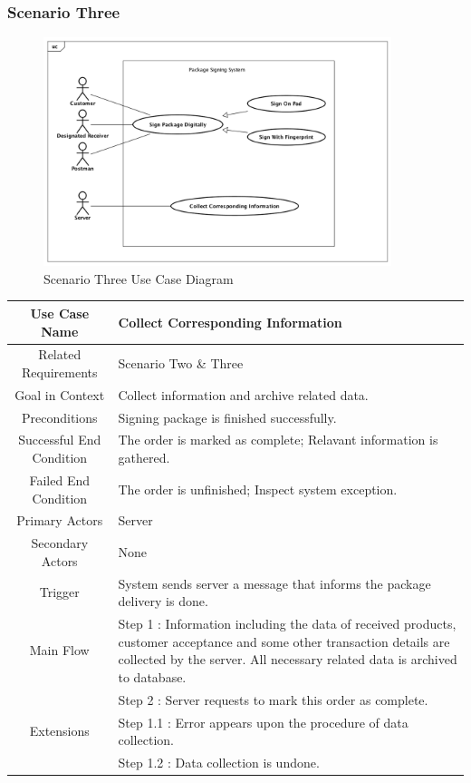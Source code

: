 \documentclass[12pt]{scrreprt}
\begin{document}
\subsubsection{Scenario Three}
\begin{figure}[H]
  \centering\includegraphics[width=4in]{DocumentRes/3UseCaseDiagram.png}
  \caption{Scenario Three Use Case Diagram}
\end{figure}

\begin{table}[H]
  \centering
  \begin{tabular}{| c | p{11cm} |}
    \hline
    Use Case Name & Collect Corresponding Information\\
    \hline
    Related Requirements & Scenario Two \& Three\\
    \hline
    Goal in Context & Collect information and archive related data.\\
    \hline
    Preconditions & Signing package is finished successfully.\\
    \hline
    Successful End Condition & The order is marked as complete; Relavant
    information is gathered.\\
    \hline
    Failed End Condition & The order is unfinished; Inspect system exception.\\
    \hline
    Primary Actors & Server\\
    \hline
    Secondary Actors & None\\
    \hline
    Trigger & System sends server a message that informs the package delivery
    is done.\\
    \hline
    Main Flow & Step 1 : Information including the data of received products,
    customer acceptance and some other transaction details are collected by
    the server. All necessary related data is archived to database.\\
    & Step 2 : Server requests to mark this order as complete.\\
    \hline
    Extensions & Step 1.1 : Error appears upon the procedure of data
    collection.\\
    & Step 1.2 : Data collection is undone.\\
    \hline
  \end{tabular}
\end{table}
\end{document}

